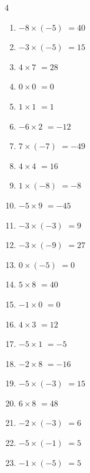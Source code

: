 \begin{multicols}{4}
\begin{enumerate}
  \item $-8\times (-5)$
        $=40$

  \item $-3\times (-5)$
        $=15$

  \item $4\times 7$
        $=28$

  \item $0\times 0$
        $=0$

  \item $1\times 1$
        $=1$

  \item $-6\times 2$
        $=-12$

  \item $7\times (-7)$
        $=-49$

  \item $4\times 4$
        $=16$

  \item $1\times (-8)$
        $=-8$

  \item $-5\times 9$
        $=-45$

  \item $-3\times (-3)$
        $=9$

  \item $-3\times (-9)$
        $=27$

  \item $0\times (-5)$
        $=0$

  \item $5\times 8$
        $=40$

  \item $-1\times 0$
        $=0$

  \item $4\times 3$
        $=12$

  \item $-5\times 1$
        $=-5$

  \item $-2\times 8$
        $=-16$

  \item $-5\times (-3)$
        $=15$

  \item $6\times 8$
        $=48$

  \item $-2\times (-3)$
        $=6$

  \item $-5\times (-1)$
        $=5$

  \item $-1\times (-5)$
        $=5$


\end{enumerate}
\end{multicols}
